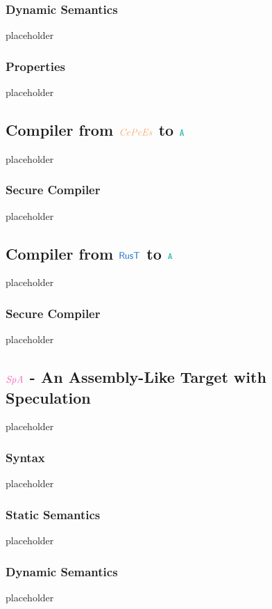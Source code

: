 \documentclass[a4paper,12pt]{article}
\begin{document}
\subsubsection{Dynamic Semantics}\label{subsec-a-dynamic}
placeholder
\subsubsection{Properties}\label{subsec-a-properties}
placeholder


\subsection{Compiler from $\irl{CePeEs}$ to $\obj{A}$}\label{subsec-cepees-to-a}
placeholder
\subsubsection{Secure Compiler}\label{subsec-cepees-to-a-seccomp}
placeholder

\subsection{Compiler from $\src{RusT}$ to $\obj{A}$}\label{subsec-rust-to-a}
placeholder
\subsubsection{Secure Compiler}\label{subsec-rust-to-a-seccomp}
placeholder


\subsection{$\ird{SpA}$ - An Assembly-Like Target with Speculation}\label{subsec-spa}
placeholder
\subsubsection{Syntax}\label{subsec-spa-syntax}
placeholder
\subsubsection{Static Semantics}\label{subsec-spa-static}
placeholder
\subsubsection{Dynamic Semantics}\label{subsec-spa-dynamic}
placeholder
\end{document}
